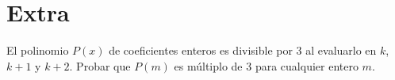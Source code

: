 \section{Extra}

\begin{section-problem}
    El polinomio $P(x)$ de coeficientes enteros es divisible por 3 al evaluarlo en $k$, $k + 1$ y $k + 2$.
    Probar que $P(m)$ es múltiplo de 3 para cualquier entero $m$.
\end{section-problem}